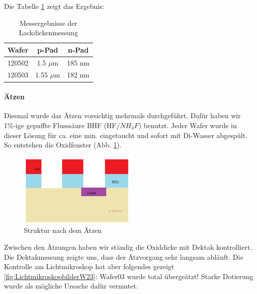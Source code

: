 Die Tabelle \ref{tab:Messergebnisse der Lackdickenmessung} zeigt das Ergebnis:

\begin{table}[htbp]
\centering
\caption{Messergebnisse der Lackdickenmessung}
\begin{tabular}{|c|c|c|}

       \hline
       Wafer  & p-Pad & n-Pad \\
        \hline
       120502      & 1.5 $\mu$m & 185 nm       \\
        \hline
       120503    & 1.55 $\mu$m  & 182 nm        \\
        \hline

\end{tabular}
\label{tab:Messergebnisse der Lackdickenmessung}
\end{table}


\paragraph[Ätzen]{Ätzen}

Diesmal wurde das Ätzen vorsichtig mehrmals durchgeführt. Dafür haben wir 1\%-ige gepuffte Flusssäure BHF (HF/$NH_3F$) benutzt. Jeder Wafer wurde in dieser Lösung für ca. eine min. eingetaucht und sofort mit Di-Wasser abgespült. So entstehen die Oxidfenster (Abb. \ref{fig:StrukturnachdemAetzen2}).


\begin{figure}[H]
    \centering
        \includegraphics[width=0.5\textwidth]{bilder/StrukturnachdemAetzen2.png}
    \caption{Struktur nach dem Ätzen}
    \label{fig:StrukturnachdemAetzen2}
\end{figure}

Zwischen den Ätzungen haben wir ständig die Oxiddicke mit Dektak kontrolliert. Die Dektakmessung zeigte uns, dass der Ätzvorgang sehr langsam abläuft. Die Kontrolle am Lichtmikroskop hat aber folgendes gezeigt \ref{fig:LichtmikroskopbilderW23}:
Wafer03 wurde total übergeätzt! Starke Dotierung wurde als mögliche Ursache dafür vermutet.

